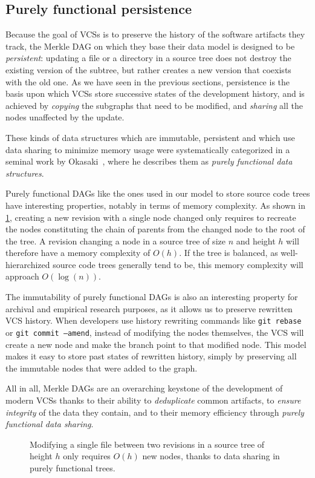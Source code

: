 \subsection{Purely functional persistence}
\label{sec:purely-functional}

Because the goal of \glspl{VCS} is to preserve the history of the software
artifacts they track, the Merkle DAG on which they base their data model is
designed to be \emph{persistent}: updating a file or a directory in a source
tree does not destroy the existing version of the subtree, but rather creates a
new version that coexists with the old one. As we have seen in the previous
sections, persistence is the basis upon which \glspl{VCS} store successive
states of the development history, and is achieved by \emph{copying} the
subgraphs that need to be modified, and \emph{sharing} all the nodes unaffected
by the update.

These kinds of data structures which are immutable, persistent and which use
data sharing to minimize memory usage were systematically categorized in a
seminal work by Okasaki~\cite{okasaki1999purely}, where he describes them as
\emph{purely functional data structures}.

Purely functional \glspl{DAG} like the ones used in our model to store source
code trees have interesting properties, notably in terms of memory complexity.
As shown in \cref{fig:okasaki-complexity}, creating a new revision with a
single node changed only requires to recreate the nodes constituting the chain
of parents from the changed node to the root of the tree. A revision changing a
node in a source tree of size $n$ and height $h$ will therefore have a memory
complexity of $O(h)$. If the tree is balanced, as well-hierarchized source code
trees generally tend to be, this memory complexity will approach $O(\log(n))$.

The immutability of purely functional \glspl{DAG} is also an interesting
property for archival and empirical research purposes, as it allows us to
preserve rewritten \gls{VCS} history. When developers use history rewriting
commands like \texttt{git rebase} or \texttt{git commit --amend}, instead of
modifying the nodes themselves, the \gls{VCS} will create a new node and make
the branch point to that modified node. This model makes it easy to store
past states of rewritten history, simply by preserving all the immutable nodes
that were added to the graph.

All in all, Merkle \glspl{DAG} are an overarching keystone of the development
of modern \glspl{VCS} thanks to their ability to \emph{deduplicate} common
artifacts, to \emph{ensure integrity} of the data they contain, and to their
memory efficiency through \emph{purely functional data sharing}.

\begin{figure}
    \centering
    
    \caption{Modifying a single file between two revisions in a source tree of
    height $h$ only requires $O(h)$ new nodes, thanks to data sharing in purely
    functional trees.}%
    \label{fig:okasaki-complexity}
\end{figure}
